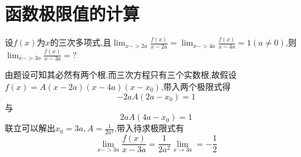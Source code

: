\documentclass[12pt, a4paper, oneside, UTF8]{ctexbook}
\begin{document}
\section{函数极限值的计算}

\begin{example}
    设$f(x)$为$x$的三次多项式,且$\lim_{x->2a}\frac{f(x)}{x-2a}=\lim_{x->4a}\frac{f(x)}{x-4a}=1(a\neq 0)$,则
    $\lim_{x->3a}\frac{f(x)}{x-3a}=?$
\end{example}

\begin{solution}
    由题设可知其必然有两个根,而三次方程只有三个实数根,故假设$f(x)=A(x-2a)(x-4a)(x-x_0)$,带入两个极限式得
    \[
    -2aA(2a-x_0) = 1
    \]
    与
    \[
    2aA(4a-x_0) = 1
    \]
    联立可以解出$x_0=3a,A=\frac{1}{2a^2}$,带入待求极限式有
    \[
    \lim_{x->3a}\frac{f(x)}{x-3a} = \frac{1}{2a^2}\lim_{x\rightarrow 3a}=-\frac{1}{2}
    \]
\end{solution}
\end{document}
